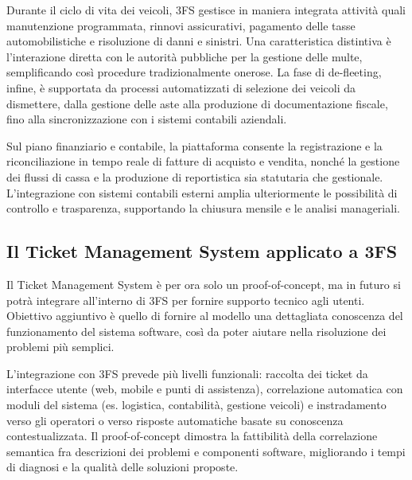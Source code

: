 Durante il ciclo di vita dei veicoli, 3FS{\textsuperscript{\tiny\textcopyright}} gestisce in maniera integrata attività quali manutenzione programmata, rinnovi assicurativi, 
pagamento delle tasse automobilistiche e risoluzione di danni e sinistri. Una caratteristica distintiva è l'interazione diretta con le autorità 
pubbliche per la gestione delle multe, semplificando così procedure tradizionalmente onerose. La fase di de-fleeting, infine, è supportata 
da processi automatizzati di selezione dei veicoli da dismettere, dalla gestione delle aste alla produzione di documentazione fiscale, fino 
alla sincronizzazione con i sistemi contabili aziendali.

Sul piano finanziario e contabile, la piattaforma consente la registrazione e la riconciliazione in tempo reale di fatture di acquisto e vendita, 
nonché la gestione dei flussi di cassa e la produzione di reportistica sia statutaria che gestionale. L'integrazione con sistemi contabili esterni 
amplia ulteriormente le possibilità di controllo e trasparenza, supportando la chiusura mensile e le analisi manageriali. \cite{progesoftware_3fs}

\subsection{Il Ticket Management System applicato a 3FS{\textsuperscript{\tiny\textcopyright}}}
Il Ticket Management System è per ora solo un proof-of-concept, ma in futuro si potrà integrare all'interno di 3FS{\textsuperscript{\tiny\textcopyright}} per fornire supporto tecnico agli utenti.
Obiettivo aggiuntivo è quello di fornire al modello una dettagliata conoscenza del funzionamento del sistema software, così da poter aiutare nella risoluzione
dei problemi più semplici.

L'integrazione con 3FS{\textsuperscript{\tiny\textcopyright}} prevede più livelli funzionali: raccolta dei ticket da interfacce utente (web, mobile e punti di assistenza), correlazione automatica
con moduli del sistema (es. logistica, contabilità, gestione veicoli) e instradamento verso gli operatori o verso risposte automatiche basate su conoscenza
contestualizzata. Il proof-of-concept dimostra la fattibilità della correlazione semantica fra descrizioni dei problemi e componenti software, migliorando 
i tempi di diagnosi e la qualità delle soluzioni proposte.

